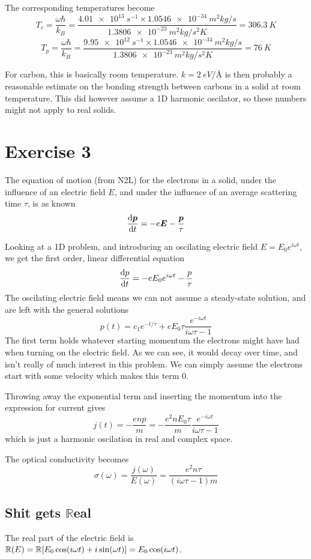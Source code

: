 \documentclass[12p,a4paper]{article}
\renewcommand{\exp}{e^}
\renewcommand{\b}{\boldsymbol}
\newcommand{\m}{\mathbb}
\renewcommand{\exp}{e^}
\begin{document}
The corresponding temperatures become
\[
    T_c = \frac{\omega \hbar}{k_B} = \frac{\SI{4.01e13}{s^{-1}}\times \SI{1.0546e-34}{m^2kg/s}}{\SI{1.3806e-23}{m^2kg/s^2K}} = \SI{306.3}{K}
\]
\[
    T_p = \frac{\omega \hbar}{k_B} = \frac{\SI{9.95e12}{s^{-1}}\times \SI{1.0546e-34}{m^2kg/s}}{\SI{1.3806e-23}{m^2kg/s^2K}} = \SI{76}{K}
\]

For carbon, this is basically room temperature. $k=\SI{2}{eV/Å}$ is then probably a reasonable estimate on the bonding strength between carbons in a solid at room temperature. This did however assume a 1D harmonic oscilator, so these numbers might not apply to real solids.


\section*{Exercise 3}
The equation of motion (from N2L) for the electrons in a solid, under the influence of an electric field $E$, and under the influence of an average scattering time $\tau$, is as known
\[
    \dv{\b p}{t} = -e\b E - \frac{\b p}{\tau}
\]

Looking at a 1D problem, and introducing an oscilating electric field $E = E_0 \exp{i\omega t}$, we get the first order, linear differential equation
\[
    \dv{p}{t} = -eE_0 \exp{i\omega t} - \frac{p}{\tau}
\]
The oscilating electric field means we can not assume a steady-state solution, and are left with the general solutions
\[
    p(t) = c_1 \exp{-t/\tau} + eE_0\tau\frac{\exp{-i\omega t}}{i\omega \tau - 1}
\]
The first term holds whatever starting momentum the electrons might have had when turning on the electric field. As we can see, it would decay over time, and isn't really of much interest in this problem. We can simply assume the electrons start with some velocity which makes this term 0.

Throwing away the exponential term and inserting the momentum into the expression for current gives
\[
    j(t) = -\frac{enp}{m} = -\frac{e^2nE_0\tau}{m}\frac{\exp{-i\omega t}}{i \omega \tau - 1}
\]
which is just a harmonic oscilation in real and complex space.

The optical conductivity becomes
\[
    \sigma(\omega) = \frac{j(\omega)}{E(\omega)} = \frac{e^2n\tau}{(i\omega\tau - 1)m}
\]

\subsection*{Shit gets $\m R$eal}
The real part of the electric field is $\m R(E) = \m R\qty[E_0\cos(i\omega t) + i\sin(\omega t)] = E_0\cos(i\omega t)$.
\end{document}

